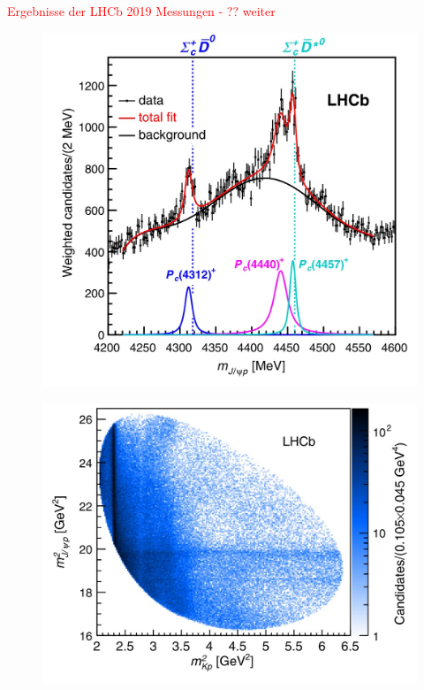 \documentclass[aspectratio=169]{beamer} %
\begin{document}
      \begin{frame}{\textcolor{red}{Ergebnisse der LHCb 2019 Messungen - ?? weiter}}
        \begin{minipage}{0.48\textwidth}
          \begin{figure}\includegraphics[width=\textwidth]{Images/76e29612-a8a4-4650-8573-5e331d33a362.jpg}%
            \\\protect\cite[S.~4]{Aaij.2019}\end{figure}
        \end{minipage}
        \hfill
        \begin{minipage}{0.48\textwidth}
          \begin{figure}\includegraphics[width=\textwidth]{Images/e4479e29-be8d-4b9c-bfc4-f1747ace3818.jpg}%
            \\\protect\cite[S.~2]{Aaij.2019}\end{figure}
        \end{minipage}
      \end{frame}
    
\end{document}
